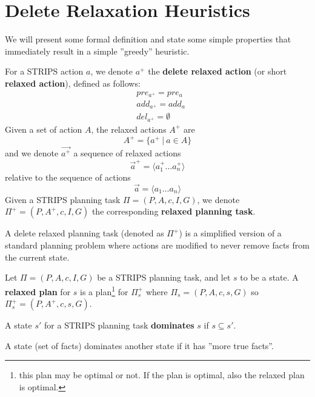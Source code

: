 \documentclass[10pt, letterpaper]{report}
\begin{document}
\section{Delete Relaxation Heuristics}
We will present some formal definition and state some
simple properties that immediately result in a simple ''greedy'' heuristic.
\begin{definition}
    For a STRIPS action $a$, we denote $a^+$ the \textbf{delete relaxed action} (or short \textbf{relaxed action}), defined as follows:\begin{align*}
        &pre_{a^+}=pre_a\\ 
         &add_{a^+}=add_a\\ 
          &del_{a^+}=\emptyset
    \end{align*}
    Given a set of action $A$, the relaxed actions $A^+$ are\begin{equation}
        A^+=\{a^+ \ | \ a\in A\}
    \end{equation} 
    and we denote $\vec{a^+}$ a sequence of relaxed actions \begin{equation}
        \vec{a}^+=\langle a_1^+\dots a_n^+ \rangle
    \end{equation}
    relative to the sequence of actions\begin{equation}
        \vec{a}=\langle a_1\dots a_n \rangle
    \end{equation}
    Given a STRIPS planning task $\Pi=(P,A,c,I,G)$, we denote $\Pi^+=(P,A^+,c,I,G)$ the corresponding \textbf{relaxed planning task}.
\end{definition}

A delete relaxed planning task (denoted as $\Pi^+$) is a simplified version of a standard planning problem where actions are modified to never remove facts from the current state.

\begin{definition}
    Let $\Pi=(P,A,c,I,G)$ be a STRIPS planning task, and let $s$ to be a state. A \textbf{relaxed plan} for $s$ is a plan\footnote{
        this plan may be optimal or not. If the plan is optimal, also the relaxed plan is optimal.
    } for $\Pi^+_s$ where $\Pi_s=(P,A,c,s,G)$ so $\Pi^+_s=(P,A^+,c,s,G)$.
\end{definition}

\begin{definition}
    A state $s'$ for a STRIPS planning task \textbf{dominates} $s$ if $s\subseteq s'$.
\end{definition}
A state (set of facts) dominates another state if it has ''more true facts''.
\end{document}
